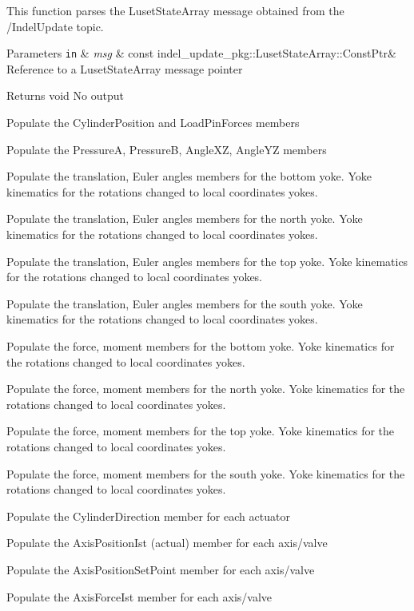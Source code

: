 This function parses the Luset\+State\+Array message obtained from the /\+Indel\+Update topic. 


\begin{DoxyParams}[1]{Parameters}
\mbox{\tt in}  & {\em msg} & const indel\+\_\+update\+\_\+pkg\+::\+Luset\+State\+Array\+::\+Const\+Ptr\& Reference to a Luset\+State\+Array message pointer \\
\hline
\end{DoxyParams}
\begin{DoxyReturn}{Returns}
void No output 
\end{DoxyReturn}
Populate the Cylinder\+Position and Load\+Pin\+Forces members

Populate the PressureA, PressureB, Angle\+XZ, Angle\+YZ members

Populate the translation, Euler angles members for the bottom yoke. Yoke kinematics for the rotations changed to local coordinates yokes.

Populate the translation, Euler angles members for the north yoke. Yoke kinematics for the rotations changed to local coordinates yokes.

Populate the translation, Euler angles members for the top yoke. Yoke kinematics for the rotations changed to local coordinates yokes.

Populate the translation, Euler angles members for the south yoke. Yoke kinematics for the rotations changed to local coordinates yokes.

Populate the force, moment members for the bottom yoke. Yoke kinematics for the rotations changed to local coordinates yokes.

Populate the force, moment members for the north yoke. Yoke kinematics for the rotations changed to local coordinates yokes.

Populate the force, moment members for the top yoke. Yoke kinematics for the rotations changed to local coordinates yokes.

Populate the force, moment members for the south yoke. Yoke kinematics for the rotations changed to local coordinates yokes.

Populate the Cylinder\+Direction member for each actuator

Populate the Axis\+Position\+Ist (actual) member for each axis/valve

Populate the Axis\+Position\+Set\+Point member for each axis/valve

Populate the Axis\+Force\+Ist member for each axis/valve

